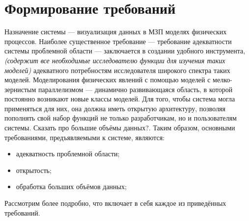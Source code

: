 \documentclass[a4paper,12pt]{extarticle}
\let\stdsection\section
\renewcommand\section{
    \newpage
    \stdsection
}
\begin{document}
\section{Формирование требований}
\label{sec:requirements}

Назначение системы — визуализация данных в МЗП моделях физических процессов.  Наиболее существенное требование --- требование адекватности системы проблемной области --- заключается в создании удобного инструмента, \textit{(содержит все необходимые исследователю функции для изучения таких моделей)} адекватного потребностям исследователя широкого спектра таких моделей.  Моделирования физических явлений с помощью моделей с мелко-зернистым параллелизмом — динамично развивающаяся область, в которой постоянно возникают новые классы моделей. Для того, чтобы система могла применяться для них, она должна иметь открытую архитектуру, позволяя пополнять свой набор функций не только разработчикам, но и пользователям системы. Сказать про большие объёмы данных?. Таким образом, основными требованиями, предъявляемыми к системе, являются:
\begin{itemize}
    \item адекватность проблемной области;
    \item открытость;
    \item обработка больших объёмов данных;
\end{itemize}

Рассмотрим более подробно, что включает в себя каждое из приведённых требований.
\end{document}
